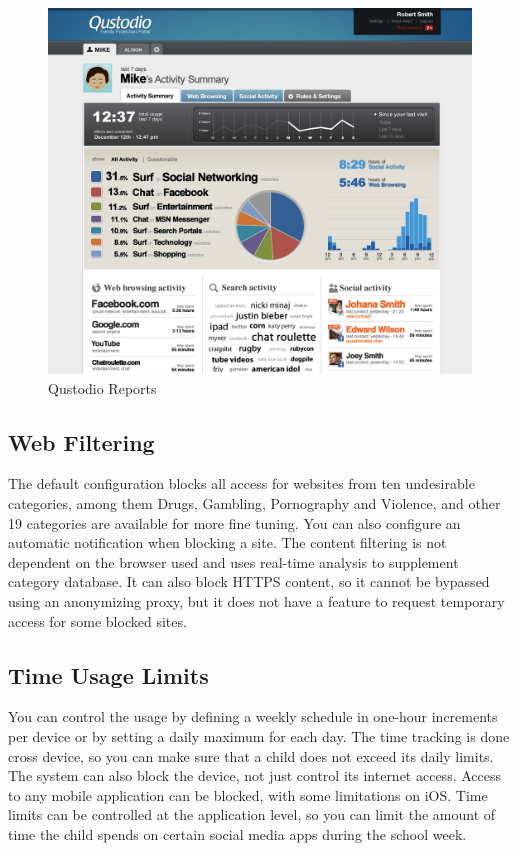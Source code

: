 \begin{figure}[th]
\centering
\includegraphics[width=1\textwidth]{Figures/qustodio}
\decoRule
\caption{Qustodio Reports}
\label{fig:qustodio}
\end{figure}

\subsection{Web Filtering}

The default configuration blocks all access for websites from ten undesirable categories, among them Drugs, Gambling, Pornography and Violence, and other 19 categories are available for more fine tuning. You can also configure an automatic notification when blocking a site. The content filtering is not dependent on the browser used and uses real-time analysis to supplement category database. It can also block HTTPS content, so it cannot be bypassed using an anonymizing proxy, but it does not have a feature to request temporary access for some blocked sites.

\subsection{Time Usage Limits}

You can control the usage by defining a weekly schedule in one-hour increments per device or by setting a daily maximum for each day. The time tracking is done cross device, so you can make sure that a child does not exceed its daily limits. The system can also block the device, not just control its internet access. Access to any mobile application can be blocked, with some limitations on iOS. Time limits can be controlled at the application level, so you can limit the amount of time the child spends on certain social media apps during the school week.


